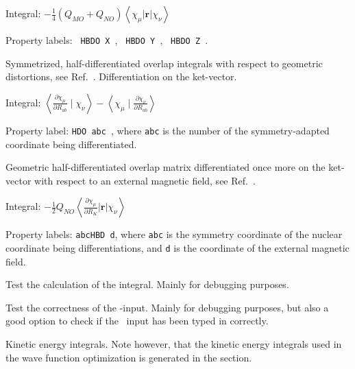 \begin{description}
\begin{list}{}{}
\item Integral: $-\frac{1}{4}\left(Q_{MO} +
Q_{NO}\right)\left<\chi_{\mu}\left|{\mathbf r}\right|\chi_{\nu}\right>$
\item Property labels: \verb| HBDO X |, \verb| HBDO Y |, \verb| HBDO Z |.
\end{list}

\item[\Key{HDO}] Symmetrized, half-differentiated
overlap integrals with respect to geometric
distortions, see
Ref.~\cite{klbpjhjajjothjcp97}. Differentiation on the ket-vector.

\begin{list}{}{}
\item Integral: $\left<\frac{\partial \chi_{\mu}}{\partial
R_{ab}}\mid\chi_{\nu}\right> -
\left<\chi_{\mu}\mid\frac{\partial\chi_{\nu}}{\partial R_{ab}}\right>$
\item Property label: \verb|HDO abc |, where \verb|abc| is the number
of the symmetry-adapted coordinate being differentiated.
\end{list}

\item[\Key{HDOBR}] Geometric half-differentiated overlap
matrix
differentiated once more on the ket-vector with respect to an external
magnetic field, see Ref.~\cite{klbpjthkrhjajjcp98}.

\begin{list}{}{}
\item Integral: $-\frac{1}{2}Q_{NO}\left<\frac{\partial
\chi_{\mu}}{\partial R_K}\left|{\mathbf r}\right|\chi_{\nu}\right>$
\item Property labels: \verb|abcHBD d|, where \verb|abc| is the
symmetry coordinate of the nuclear coordinate being differentiations,
and \verb|d| is the coordinate of the external magnetic field.
\end{list}

\item[\Key{HDOBRT}] Test the calculation of the 
integral. Mainly for debugging purposes.

\item[\Key{INPTES}] Test the correctness of the -input. Mainly
for debugging purposes, but also a good option to check if the \molinp\ input
has been typed in correctly.

\item[\Key{KINENE}] Kinetic energy integrals. Note however, that the kinetic energy integrals used in the
wave function optimization is generated in the  section.


\end{description}
